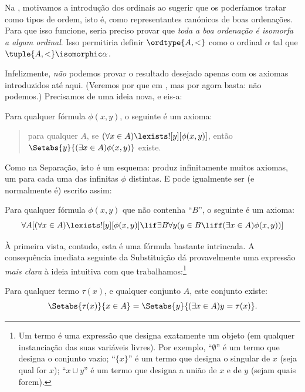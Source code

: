 \documentclass[../../../include/open-logic-section]{subfiles}
\begin{document}

Na , motivamos a introdução dos ordinais ao
sugerir que os poderíamos tratar como tipos de ordem, isto é, como
representantes canónicos de boas ordenações. Para que isso funcione,
seria preciso provar que \emph{toda a boa ordenação é isomorfa a algum
ordinal}. Isso permitiria definir $\ordtype{A, <}$ como o ordinal
$\alpha$ tal que $\tuple{A, <} \isomorphic \alpha$.

Infelizmente, \emph{não} podemos provar o resultado desejado apenas
com os axiomas introduzidos até aqui. (Veremos por que em
, mas por agora basta: não podemos.)
Precisamos de uma ideia nova, e eis-a:

\begin{axiom}
Para qualquer fórmula $\phi(x, y)$, o seguinte é um axioma:
\begin{quote}
	para qualquer $A$, se $(\forall x \in A)\lexists![y][\phi(x,y)]$, então
	$\Setabs{y}{(\exists x \in A)\phi(x,y)}$ existe.
\end{quote}
\end{axiom}
\noindent
Como na Separação, isto é um esquema: produz infinitamente muitos
axiomas, um para cada uma das infinitas $\phi$ distintas. E pode
igualmente ser (e normalmente é) escrito assim:

\begin{defish}
Para qualquer fórmula $\phi(x,y)$ que não contenha ``$B$'', o seguinte é um axioma:
\[
\forall A[(\forall x \in A)\lexists![y][\phi(x,y)] \lif \exists B\forall y (y \in B \liff (\exists x \in A)\phi(x,y))]
\]
\end{defish}

À primeira vista, contudo, esta é uma fórmula bastante intrincada. A
consequência imediata seguinte da Substituição dá provavelmente uma
expressão \emph{mais clara} à ideia intuitiva com que trabalhamos:\footnote{Um termo é uma expressão que designa exatamente um objeto (em qualquer instanciação das suas variáveis livres). Por exemplo, ``$\emptyset$'' é um termo que designa o conjunto vazio; ``$\{x\}$'' é um termo que designa o singular de $x$ (seja qual for $x$); ``$x \cup y$'' é um termo que designa a união de $x$ e de $y$ (sejam quais forem).}

\begin{cor}
Para qualquer termo $\tau(x)$, e qualquer conjunto $A$, este conjunto existe:
\[
	\Setabs{\tau(x)}{x \in A} = \Setabs{y}{(\exists x \in A)y = \tau(x)}.
\]
\end{cor}
\end{document}
